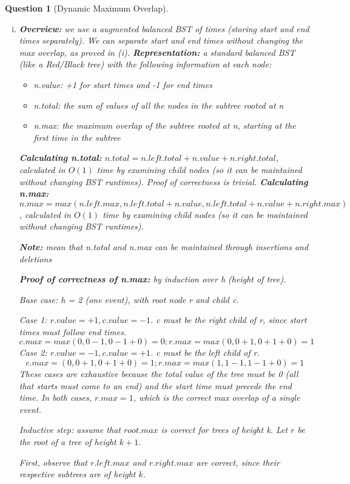 \documentclass{article}
\newtheorem{ques}{Question}
\renewcommand{\b}[1]{\textbf{#1}}
\begin{document}
\begin{ques}[Dynamic Maximum Overlap]
\begin{enumerate}[i.]
  \item 
  \b{Overview:} we use a augmented balanced BST of times (storing start and end times separately). We can separate start and end times without changing the max overlap, as proved in (i).
  \b{Representation:} a standard balanced BST (like a Red/Black tree) with the following information at each node:
  \begin{itemize}
    \item n.value: +1 for start times and -1 for end times 
    \item n.total: the sum of values of all the nodes in the subtree rooted at n
    \item n.max: the maximum overlap of the subtree rooted at n, starting at the first time in the subtree
  \end{itemize}
  \b{Calculating n.total:} $n.total = n.left.total + n.value + n.right.total$, calculated in $O(1)$ time by examining child nodes (so it can be maintained without changing BST runtimes). Proof of correctness is trivial.
  \b{Calculating n.max:} $n.max = max(n.left.max, n.left.total + n.value, n.left.total + n.value + n.right.max)$, calculated in $O(1)$ time by examining child nodes (so it can be maintained without changing BST runtimes).

  \b{Note:}  mean that n.total and n.max can be maintained through insertions and deletions

  \b{Proof of correctness of n.max:} by induction over h (height of tree).

  Base case: h = 2 (one event), with root node r and child c. 

  Case 1: $r.value = +1, c.value = -1$. c must be the right child of r, since start times must follow end times. 
  $$c.max = max(0, 0 - 1, 0 - 1 + 0) = 0; r.max = max(0, 0 + 1, 0 + 1 + 0) = 1$$
  Case 2: $r.value = -1, c.value = +1$. c must be the left child of r.
  $$c.max = (0, 0 + 1, 0 + 1 + 0) = 1; r.max = max(1, 1 - 1, 1 - 1 + 0) = 1$$
  These cases are exhaustive because the total value of the tree must be 0 (all that starts must come to an end) and the start time must precede the end time. In both cases, $r.max = 1$, which is the correct max overlap of a single event.

  Inductive step: assume that $root.max$ is correct for trees of height k. Let $r$ be the root of a tree of height $k+1$.

  First, observe that $r.left.max$ and $r.right.max$ are correct, since their respective subtrees are of height $k$. 


\end{enumerate}
\end{ques}
\end{document}
